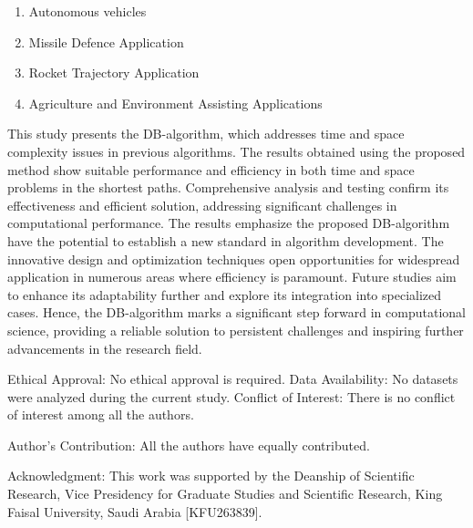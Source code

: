 \documentclass[10pt]{NSP1}
\begin{document}
\par\medskip{}\smallskip

\begin{enumerate}
  \item Autonomous vehicles
  \item Missile Defence Application
  \item Rocket Trajectory Application
  \item Agriculture and Environment Assisting Applications
\end{enumerate}

\par\medskip{}\smallskip

This study presents the DB-algorithm, which addresses time and space complexity issues in previous algorithms. The results obtained using the proposed method show suitable performance and efficiency in both time and space problems in the shortest paths. Comprehensive analysis and testing confirm its effectiveness and efficient solution, addressing significant challenges in computational performance. The results emphasize the proposed DB-algorithm have the potential to establish a new standard in algorithm development. The innovative design and optimization techniques open opportunities for widespread application in numerous areas where efficiency is paramount. Future studies aim to enhance its adaptability further and explore its integration into specialized cases. Hence, the DB-algorithm marks a significant step forward in computational science, providing a reliable solution to persistent challenges and inspiring further advancements in the research field.

\par\medskip{}\smallskip

Ethical Approval: No ethical approval is required.
Data Availability: No datasets were analyzed during the current study.
Conflict of Interest: There is no conflict of interest among all the authors.

Author’s Contribution: All the authors have equally contributed.

Acknowledgment: This work was supported by the Deanship of Scientific Research, Vice Presidency for Graduate Studies and Scientific Research, King Faisal University, Saudi Arabia [KFU263839].
\end{document}
